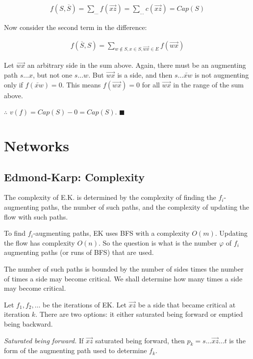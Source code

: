 \begin{align*}
    f(S, \overline{S}) = \sum_{\ldots} f(\overrightarrow{xz}) = \sum_{\ldots}
    c(\overrightarrow{xz}) = Cap(S)
\end{align*}

Now consider the second term in the difference:

\begin{align*}
    f(\overline{S}, S) = \sum_{w \not\in S, x \in S, \overrightarrow{wx} \in E}
    f(\overrightarrow{wx})
\end{align*}

Let $\overrightarrow{wx}$ an arbitrary side in the sum above. Again,
there must be an augmenting path $s \ldots x$, but not one 
$s \ldots w$. But $\overrightarrow{wx}$ is a side, and then 
$s \ldots \overleftarrow{xw}$ is not augmenting only if 
$f(\overleftarrow{xw}) = 0$. This means $f(\overrightarrow{wx}) = 0$
for all $\overrightarrow{wx}$ in the range of the sum above.

$\therefore $  $v(f) = Cap(S) - 0 = Cap(S)$. $\blacksquare$

\pagebreak

\section{Networks}

\subsection{Edmond-Karp: Complexity}

The complexity of E.K. is determined by the complexity of finding the
$f_i$-augmenting paths, the number of such paths, and the complexity 
of updating the flow with such paths. 

To find $f_i$-augmenting paths, EK uses BFS with a complexity $O(m)$. Updating
the flow has complexity $O(n)$. So the question is what is the number $\varphi$
of $f_i$ augmenting paths (or runs of BFS) that are used.

The number of such paths is bounded by the number of sides times the number of
times a side may become critical. We shall determine how many times a side may
become critical.

Let $f_1, f_2, \ldots$ be the iterations of EK. Let $\overrightarrow{xz}$ be a
side that became critical at iteration $k$. There are two options: it either
saturated being forward or emptied being backward.

\textit{Saturated being forward.} If $\overrightarrow{xz}$ saturated being
forward, then $p_k = s \ldots \overrightarrow{xz} \ldots t$ is the form of the
augmenting path used to determine $f_k$. 

